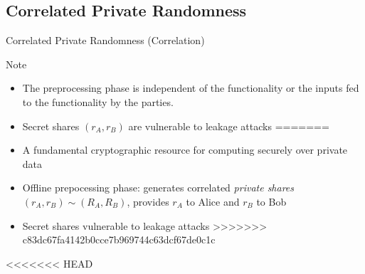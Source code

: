 \subsection{Correlated Private Randomness}
\begin{frame}{Correlated Private Randomness (Correlation)}

	{
	\begin{block}{Note}
	\begin{itemize}
<<<<<<< HEAD
		\item  The preprocessing phase is independent of the functionality or the inputs fed to the functionality by the parties.
		\item Secret shares $(r_A, r_B)  $ are vulnerable to leakage attacks
=======
		\item A fundamental cryptographic resource for computing securely over private data
		\item Offline prepocessing phase: generates correlated {\em private shares} $ (r_A, r_B) \sim (R_A, R_B) $, provides $r_A$ to Alice and $r_B$ to Bob 
		\item Secret shares vulnerable to leakage attacks
>>>>>>> c83dc67fa4142b0cce7b969744c63dcf67de0c1c
	\end{itemize}
	\end{block}}

<<<<<<< HEAD
		

\end{frame}
